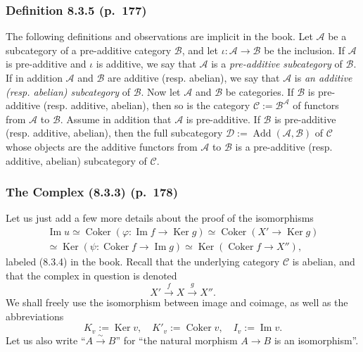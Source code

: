 \documentclass[12pt]{article}
\theoremstyle{remark}
\theoremstyle{definition}
\newcommand{\cc}{\mathcal}
\newcommand{\C}{\mathcal C}
\newcommand{\pp}{\varphi}
\DeclareMathOperator{\Ad}{Add}
\DeclareMathOperator{\Coker}{Coker}
\DeclareMathOperator{\Ima}{Im}
\DeclareMathOperator{\Ker}{Ker}
\begin{document}

\subsubsection{Definition 8.3.5 (p.~177)}

The following definitions and observations are implicit in the book. Let $\cc A$ be a subcategory of a pre-additive category $\cc B$, and let $\iota:\cc A\to \cc B$ be the inclusion. If $\cc A$ is pre-additive and $\iota$ is additive, we say that $\cc A$ is a {\em pre-additive subcategory} of $\cc B$. If in addition $\cc A$ and $\cc B$ are additive (resp. abelian), we say that $\cc A$ is {\em an additive (resp. abelian) subcategory} of $\cc B$. Now let $\cc A$ and $\cc B$ be categories. If $\cc B$ is pre-additive (resp. additive, abelian), then so is the category $\cc C:=\cc B^\cc A$ of functors from $\cc A$ to $\cc B$. Assume in addition that $\cc A$ is pre-additive. If $\cc B$ is pre-additive (resp. additive, abelian), then the full subcategory $\cc D:=\Ad(\cc A,\cc B)$ of $\cc C$ whose objects are the additive functors from $\cc A$ to $\cc B$ is a pre-additive (resp. additive, abelian) subcategory of $\cc C$.


\subsubsection{The Complex (8.3.3) (p.~178)}

Let us just add a few more details about the proof of the isomorphisms
\begin{equation}\label{834}
\begin{split}
\Ima u\simeq\Coker(\pp:\Ima f\to\Ker g)\simeq\Coker(X'\to\Ker g)\\ 
\simeq\Ker(\psi:\Coker f\to\Ima g)\simeq\Ker(\Coker f\to X''),
\end{split}
\end{equation}
labeled (8.3.4) in the book. Recall that the underlying category $\C$ is abelian, and that the complex in question is denoted 
%
\begin{equation}\label{833}
X'\xrightarrow{f}X\xrightarrow{g}X''.
\end{equation}
%  
We shall freely use the isomorphism between image and coimage, as well as the abbreviations 
$$
K_v:=\Ker v,\quad K'_v:=\Coker v,\quad I_v:=\Ima v.
$$ 
Let us also write ``$A\overset{\sim}{\to}B$'' for ``the natural morphism $A\to B$ is an isomorphism''. 
\end{document}
